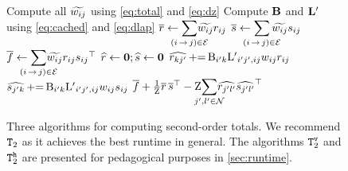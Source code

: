 \documentclass[11pt,a4paper]{article}
\theoremstyle{definition}
\begin{document}
\begin{figure}[t!]
\begin{algorithmic}[1]
\State Compute all ${\widetilde{w_{ij}}}$ using \cref{eq:total} and \cref{eq:dz}
\State Compute ${\mathbf{B}}$ and ${\mathbf{L'}}$ using \cref{eq:cached} and \cref{eq:dlap}
\State $\rbar \gets {\displaystyle\smashoperator{\sum_{\edgeij\in\edges}}}
     \totalw{ij} \redge{ij}$ {\color{gray}\algorithmiccomment{$\bigo{\nN^2\nRs}$}}
\State $\sbar \gets \smashoperator{\sum_{\edgeij\in\edges}}
     \totalw{ij} \sedge{ij}$ {\color{gray}\algorithmiccomment{$\bigo{\nN^2\nSs}$}}
\State $\total{f} \gets {\displaystyle\smashoperator{\sum_{\edgeij\in\edges}}}
     \totalw{ij} \redge{ij}\sedge{ij}^\top$ {\color{gray}\algorithmiccomment{$\bigo{\nN^2\nRs\nSs}$}}
\State $\widehat{r} \gets \boldsymbol 0; \widehat{s} \gets \boldsymbol 0$
 {\color{gray}}
 {\color{gray}}
    \State ${\widehat{r_{kj'}}}{\,\textsf{+=}\,}{\mathrm{B}_{i'k}}{{\mathrm{L}'}_{i'j',ij}}{w_{ij}}{r_{ij}}$ {\color{gray}\algorithmiccomment{$\bigo{\nRs}$}}
    \State ${\widehat{s_{j'k}}}{\,\textsf{+=}\,}{\mathrm{B}_{i'k}}{{\mathrm{L}'}_{i'j',ij}}{w_{ij}}{s_{ij}}$ {\color{gray}\algorithmiccomment{$\bigo{\nSs}$}}
\EndFor
\EndFor
{}
\State \Return $\total{f} + \frac{1}{\wbar}\rbar\,\sbar^{\top} - \wbar {\displaystyle\smashoperator{\sum_{j',l'\in\nodes}}} \rhat{j'l'} \shat{j'l'}^\top$
\EndFunc
\end{algorithmic}
\caption{Three algorithms for computing second-order totals.  We recommend $\texttt{T}_2$ as it achieves the best runtime in general.  The algorithms $\texttt{T}_2^{\texttt{v}}$ and $\texttt{T}_2^{\texttt{h}}$ are presented for pedagogical purposes in \cref{sec:runtime}.}
\label{fig:second}
\end{figure}
\end{document}

